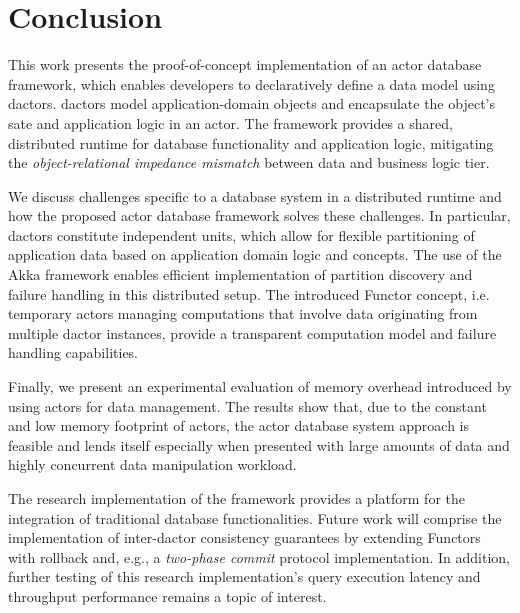 
\section{Conclusion}\label{sec:conclusion}

This work presents the proof-of-concept implementation of an actor database framework, which enables developers to declaratively define a data model using \glspl{dactor}.
\Glspl{dactor} model application-domain objects and encapsulate the object's sate and application logic in an actor.
The framework provides a shared, distributed runtime for database functionality and application logic, mitigating the \textit{object-relational impedance mismatch} between data and business logic tier.

We discuss challenges specific to a database system in a distributed runtime and how the proposed actor database framework solves these challenges.
In particular, \glspl{dactor} constitute independent units, which allow for flexible partitioning of application data based on application domain logic and concepts.
The use of the Akka framework enables efficient implementation of partition discovery and failure handling in this distributed setup.
The introduced Functor concept, i.e. temporary actors managing computations that involve data originating from multiple \gls{dactor} instances, provide a transparent computation model and failure handling capabilities.

Finally, we present an experimental evaluation of memory overhead introduced by using actors for data management.
The results show that, due to the constant and low memory footprint of actors, the actor database system approach is feasible and lends itself especially when presented with large amounts of data and highly concurrent data manipulation workload.

The research implementation of the framework provides a platform for the integration of traditional database functionalities.
Future work will comprise the implementation of inter-\gls{dactor} consistency guarantees by extending Functors with rollback and, e.g., a \textit{two-phase commit} protocol implementation.
In addition, further testing of this research implementation's query execution latency and throughput performance remains a topic of interest.